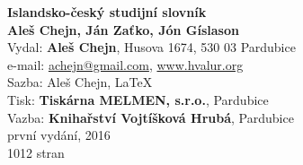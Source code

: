 \ifPDF
\else
\cleardoublepage %
\noindent\begin{minipage}[t][\textheight][t]{\textwidth}

{\Large{\textbf{Islandsko-český studijní slovník}}}\\[\baselineskip]
  {\textbf{Aleš Chejn, Ján Zaťko, Jón Gíslason}}\\[\baselineskip]
Vydal: \textbf{Aleš Chejn}, Husova 1674, 530 03 Pardubice \\
e-mail: \href{mailto:achejn@gmail.com}{achejn@gmail.com}, \url{www.hvalur.org}\\
Sazba: Aleš Chejn, \LaTeX\\
Tisk: \textbf{Tiskárna MELMEN, s.r.o.}, Pardubice\\
Vazba:  \textbf{Knihařství Vojtíšková Hrubá}, Pardubice\\
první vydání, 2016\\
1012 stran\\[\baselineskip]
\textbf\ISBN\\[\baselineskip]

\EANisbn[SC3]
\end{minipage}
\fi
\fi


\ifmakecovers
  \cleardoublepage\null\clearpage %
\covergeometry  
  \makecoverwith\backcoverimages
\restoregeometry  
\fi



